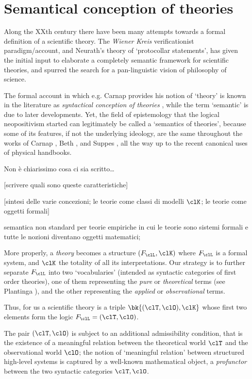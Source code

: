\section{Semantical conception of theories}
Along the XXth century there have been many attempts towards a formal definition of a scientific theory. The \emph{Wiener Kreis} verificationist paradigm/account, and Neurath's theory of `protocollar statements', has given the initial input to elaborate a completely semantic framework for scientific theories, and spurred the search for a pan-linguistic vision of philosophy of science.

The formal account in which e.g. Carnap \cite{?} provides his notion of `theory' is known in the literature as \emph{syntactical conception of theories} \cite{?}, while the term `semantic' is due to later developments. Yet, the field of epistemology that the logical neopositivism started can legitimately be called a `semantics of theories', because some of its features, if not the underlying ideology, are the same throughout the works of Carnap \cite{?},  Beth \cite{?}, and Suppes \cite{?}, all the way up to the recent canonical uses of physical handbooks.

{\color{red} Non è chiarissimo cosa ci sia scritto\dots}

	[scrivere quali sono queste caratteristiche]

	[sintesi delle varie concezioni; le teorie come classi di modelli $\clK$;
		le teorie come oggetti formali]

semantica non standard per teorie empiriche in cui le teorie sono sistemi formali e tutte le nozioni diventano oggetti matematici; 

More properly, a \emph{theory} becomes a structure $(F_\clL, \clK)$ where $F_\clL$ is a formal system, and $\clK$ the totality of all its interpretations. Our strategy is to further separate $F_\clL$ into two `vocabularies' (intended as syntactic categories of first order theories), one of them representing the \emph{pure} or \emph{theoretical} terms (see Plantinga \cite{}), and the other representing the \emph{applied} or \emph{observational} terms. 

Thus, for us a scientific theory is a triple $\bk{(\clT,\clO), \clK}$ whose first two elements form the logic $F_\clL=(\clT,\clO)$.%

The pair $(\clT,\clO)$ is subject to an additional admissibility condition, that is the existence of a meaningful relation between the theoretical world $\clT$ and the observational world $\clO$; the notion of `meaningful relation' between structured high-level systems is captured by a well-known mathematical object, a \emph{profunctor} between the two syntactic categories $\clT,\clO$. 

